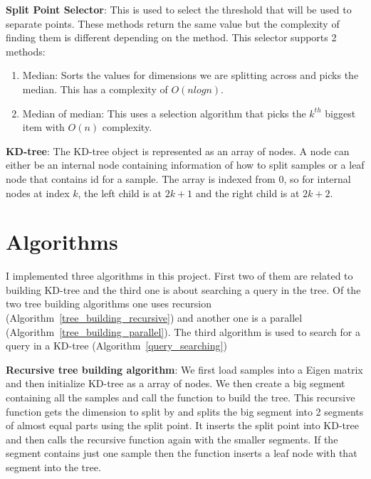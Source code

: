 \documentclass[11pt]{amsart}
\begin{document}
\begin{list}{}{\leftmargin= 1.4cm}
\item \textbf{Split Point Selector}: This is used to select the threshold that will be used to separate points. These methods return the same value but the complexity of finding them is different depending on the method. This selector supports 2 methods:
\vspace{1.5 mm}
\begin{enumerate}\setlength\itemsep{0.5em}
\item Median: Sorts the values for dimensions we are splitting across and picks the median. This has a complexity of $O(nlogn)$. 
\item Median \-of \-median: This uses a selection algorithm that picks the $k^{th}$ biggest item with $O(n)$ complexity.
\end{enumerate}

\item \textbf{KD-tree}: The KD-tree object is represented as an array of nodes. A node can either be an  internal node containing information of how to split samples or a leaf node that contains id for a sample. The array is indexed from 0, so for internal nodes at index $k$, the left child is at $2k + 1$ and the right child is at $2k + 2$.

\end{list}

\section{Algorithms}
I implemented three algorithms in this project. First two of them are related to building KD-tree and the third one is about searching a query in the tree. Of the two tree building algorithms one uses recursion (Algorithm~\ref{tree_building_recursive}) and another one is a parallel (Algorithm~\ref{tree_building_parallel}). The third algorithm is used to search for a query in a KD-tree (Algorithm~\ref{query_searching})

\vspace{5 mm}
\noindent\textbf{Recursive tree building algorithm}:  We first load samples into a Eigen matrix and then initialize KD-tree as a array of nodes. We then create a big segment containing all the samples and call the function  to build the tree. This recursive function gets the dimension to split by and splits the big segment into 2 segments of almost equal parts using the split point. It inserts the split point into KD-tree and then calls the recursive function again with the smaller segments. If the segment contains just one sample then the function inserts a leaf node with that segment into the tree.
\end{document}
